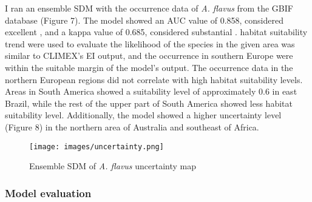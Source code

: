 I ran an ensemble SDM with the occurrence data of \textit{A. flavus} from the GBIF database \citep{https://doi.org/10.15468/dl.cak6s3} (Figure 7). The model showed an AUC value of 0.858, considered excellent \citep{mandrekar2010receiver}, and a kappa value of 0.685, considered substantial \citep{mchugh2012interrater}. habitat suitability trend were used to evaluate the likelihood of the species in the given area \citep{monnier2023species} was similar to CLIMEX's EI output, and the occurrence in southern Europe were within the suitable margin of the model's output. The occurrence data in the northern European regions did not correlate with high habitat suitability levels. Areas in South America showed a suitability level of approximately 0.6 in east Brazil, while the rest of the upper part of South America showed less habitat suitability level. Additionally, the model showed a higher uncertainty level (Figure 8) in the northern area of Australia and southeast of Africa. 

\begin{figure*}[!ht]
	\centering
	\texttt{[image: images/uncertainty.png]}
	\caption{Ensemble SDM of \textit{A. flavus} uncertainty map}
	\label{fig:Ensemble SDM uncertainty}
\end{figure*}

\subsubsection{Model evaluation}

